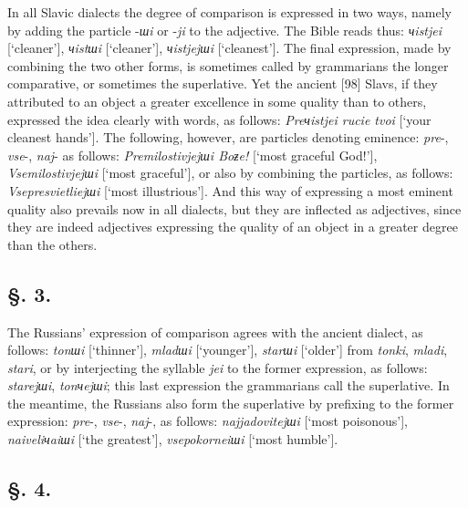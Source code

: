 In all Slavic dialects the degree of comparison is expressed in two ways, namely by adding the particle -\textit{шi} or -\textit{ji} to the adjective. The Bible reads thus: \textit{чistjei} [‘cleaner’], \textit{чistшi} [‘cleaner’], \textit{чistjejшi} [‘cleanest’]. The final expression, made by combining the two other forms, is sometimes called by grammarians the longer comparative, or sometimes the superlative. Yet the ancient [98] Slavs, if they attributed to an object a greater excellence in some quality than to others, expressed the idea clearly with words, as follows: \textit{Preчistjei rucie tvoi} [‘your cleanest hands’]. The following, however, are particles denoting eminence: \textit{pre}-, \textit{vse}-, \textit{naj}- as follows: \textit{Premilostivjejшi Boƶe!} [‘most graceful God!’], \textit{Vsemilostivjejшi} [‘most graceful’], or also by combining the particles, as follows: \textit{Vsepresvietliejшi} [‘most illustrious’]. And this way of expressing a most eminent quality also prevails now in all dialects, but they are inflected as adjectives, since they are indeed adjectives expressing the quality of an object in a greater degree than the others.

\subsection*{\hspace*{\fill}§. 3.\hspace*{\fill}}

The Russians’ expression of comparison agrees with the ancient dialect, as follows: \textit{tonшi} [‘thinner’], \textit{mladшi} [‘younger’], \textit{starшi} [‘older’] from \textit{tonki}, \textit{mladi}, \textit{stari}, or by interjecting the syllable \textit{jei} to the former expression, as follows: \textit{starejшi}, \textit{tonчejшi}; this last expression the grammarians call the superlative. In the meantime, the Russians also form the superlative by prefixing to the former expression: \textit{pre}-, \textit{vse}-, \textit{naj}-, as follows: \textit{najjadovitejшi} [‘most poisonous’], \textit{naive\-liчaiшi} [‘the greatest’], \textit{vsepokorneiшi} [‘most humble’].

\subsection*{\hspace*{\fill}§. 4.\hspace*{\fill}}

